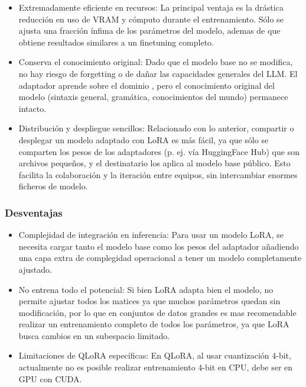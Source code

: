 \begin{itemize}

    \item Extremadamente eficiente en recursos: La principal ventaja es la drástica reducción en uso de VRAM y cómputo durante el entrenamiento. Sólo se ajusta una fracción ínfima de los parámetros del modelo, ademas de que obtiene resultados similares a un finetuning completo.

    \item Conserva el conocimiento original: Dado que el modelo base no se modifica, no hay riesgo de forgetting o de dañar las capacidades generales del LLM. El adaptador aprende sobre el dominio , pero el conocimiento original del modelo (sintaxis general, gramática, conocimientos del mundo) permanece intacto. 

    \item Distribución y despliegue sencillos: Relacionado con lo anterior, compartir o desplegar un modelo adaptado con LoRA es más fácil, ya que sólo se comparten los pesos de los adaptadores (p. ej. vía HuggingFace Hub) que son archivos pequeños, y el destinatario los aplica al modelo base público. Esto facilita la colaboración y la iteración entre equipos, sin intercambiar enormes ficheros de modelo.
\end{itemize}

\subsubsection{Desventajas}

\begin{itemize}
    \item Complejidad de integración en inferencia: Para usar un modelo LoRA, se necesita cargar tanto el modelo base como los pesos del adaptador añadiendo una capa extra de complegidad operacional a tener un modelo completamente ajustado.

    \item No entrena todo el potencial: Si bien LoRA adapta bien el modelo, no permite ajustar todos los matices ya que muchos parámetros quedan sin modificación, por lo que  en conjuntos de datos grandes es mas recomendable realizar un entrenamiento completo de todos los parámetros, ya que LoRA busca cambios en un subespacio limitado.

    \item Limitaciones de QLoRA específicas: En QLoRA, al usar cuantización 4-bit, actualmente no es posible realizar entrenamiento 4-bit en CPU, debe ser en GPU con CUDA.
\end{itemize}


